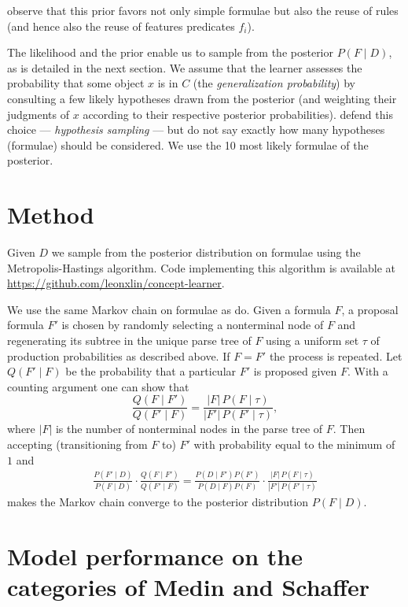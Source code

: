 \documentclass[jou,apacite]{apa6}
\begin{document}
\citet{rrdnf} observe that this prior favors not only simple
formulae but also the reuse of rules (and hence 
also the reuse of features predicates
$f_i$). 

The likelihood and the prior enable us to sample from the posterior
$P(F\mid D)$, as is detailed in the next section. We assume
that the learner assesses the probability that some object $x$
is in $C$
(the \emph{generalization probability})
 by consulting a few likely hypotheses drawn from
the posterior (and weighting their judgments of $x$ according 
to their respective posterior probabilities). \citet{rrdnf}
defend this choice --- \emph{hypothesis sampling} --- but do not
say exactly how many hypotheses (formulae) should be considered.
We use the 10 most likely formulae of the posterior.


\section{Method}

Given $D$
we sample from the posterior distribution on formulae
 using the Metropolis-Hastings
algorithm. Code implementing this algorithm is available at
\url{https://github.com/leonxlin/concept-learner}.

We use the same Markov chain on formulae as \citet{rrdnf} do.
Given a formula $F$, a proposal formula $F'$ is chosen by
randomly selecting a nonterminal node of $F$ and regenerating its
subtree in the unique parse tree of $F$ using a uniform set $\tau$ of
production probabilities as described above.
If $F=F'$ the process is repeated. Let $Q(F' \mid F)$ be the 
probability that a particular $F'$ is proposed given $F$.
With a counting argument one can show that
\[ \frac{Q(F\mid F')}{Q(F'\mid F)}
	 = \frac{|F|\,P(F\mid\tau)}{|F'|\,P(F'\mid\tau)}, \]
where $|F|$ is the number of nonterminal nodes in the parse tree
of $F$. Then accepting 
(transitioning from $F$ to)
$F'$ with probability equal to the minimum of $1$ and
\begin{align*}
	\frac{P(F'\mid D)}{P(F\mid D)}\cdot
	\frac{Q(F\mid F')}{Q(F'\mid F)} = 
	\frac{P(D\mid F')P(F')}{P(D\mid F)P(F)}\cdot
	\frac{|F|\,P(F\mid\tau)}{|F'|\,P(F'\mid\tau)}
\end{align*}
makes the Markov chain converge to the posterior distribution
$P(F\mid D)$.


\section{Model performance on the categories of Medin and Schaffer}
\end{document}
